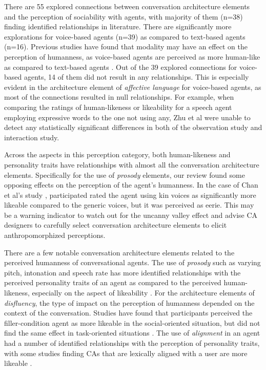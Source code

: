 There are 55 explored connections between conversation architecture elements and the perception of sociability with agents, with majority of them (n=38) finding identified relationships in literature. There are significantly more explorations for voice-based agents (n=39) as compared to text-based agents (n=16). Previous studies have found that modality may have an effect on the perception of humanness, as voice-based agents are perceived as more human-like as compared to text-based agents \cite{cho2019effects}. Out of the 39 explored connections for voice-based agents, 14 of them did not result in any relationships. This is especially evident in the architecture element of \textit{affective language} for voice-based agents, as most of the connections resulted in null relationships. For example, when comparing the ratings of human-likeness or likeability for a speech agent employing expressive words to the one not using any, Zhu et al \cite{zhu2022effects}\cmt{[26]} were unable to detect any statistically significant differences in both of the observation study and interaction study.

Across the aspects in this perception category, both human-likeness and personality traits have relationships with almost all the conversation architecture elements. Specifically for the use of \textit{prosody} elements, our review found some opposing effects on the perception of the agent's humanness. In the case of Chan et al's study \cite{chan2021kinvoices}\cmt{[74]}, participated rated the agent using kin voices as significantly more likeable compared to the generic voices, but it was perceived as eerie. This may be a warning indicator to watch out for the uncanny valley effect \cite{mori2012uncanny} and advise CA designers to carefully select conversation architecture elements to elicit anthropomorphized perceptions.

There are a few notable conversation architecture elements related to the perceived humanness of conversational agents. The use of \textit{prosody} such as varying pitch, intonation and speech rate has more identified relationships with the perceived personality traits of an agent as compared to the perceived human-likeness, especially on the aspect of likeability \cite{choi2020nobody}\cmt{[54]}\cite{jestin2022effects}\cmt{[81]}\cite{misu2011toward}\cmt{[83]}. For the architecture elements of \textit{disfluency}, the type of impact on the perception of humanness depended on the context of the conversation. Studies have found that participants perceived the filler-condition agent as more likeable in the social-oriented situation, but did not find the same effect in task-oriented situations \cite{jeong2019exploring}\cmt{[10]}\cite{wester2015artificial}\cmt{[14]}. The use of \textit{alignment} in an agent had a number of identified relationships with the perception of personality traits, with some studies finding CAs that are lexically aligned with a user are more likeable \cite{huiyang2022improving}\cmt{[17]}\cite{linnemann2018can}\cmt{[15]}. 